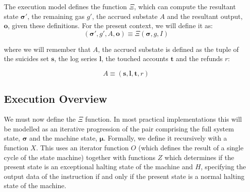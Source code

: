 \documentclass[9pt,oneside]{amsart}
\begin{document}
\begin{multicols}{2}
The execution model defines the function $\Xi$, which can compute the resultant state $\boldsymbol{\sigma}'$, the remaining gas $g'$, the accrued substate $A$ and the resultant output, $\mathbf{o}$, given these definitions. For the present context, we will define it as:
\begin{equation}
(\boldsymbol{\sigma}', g', A, \mathbf{o}) \equiv \Xi(\boldsymbol{\sigma}, g, I)
\end{equation}

where we will remember that $A$, the accrued substate is defined as the tuple of the suicides set $\mathbf{s}$, the log series $\mathbf{l}$, the touched accounts $\mathbf{t}$ and the refunds $r$:

\begin{equation}
A \equiv (\mathbf{s}, \mathbf{l}, \mathbf{t}, r)
\end{equation}

\subsection{Execution Overview}

We must now define the $\Xi$ function. In most practical implementations this will be modelled as an iterative progression of the pair comprising the full system state, $\boldsymbol{\sigma}$ and the machine state, $\boldsymbol{\mu}$. Formally, we define it recursively with a function $X$. This uses an iterator function $O$ (which defines the result of a single cycle of the state machine) together with functions $Z$ which determines if the present state is an exceptional halting state of the machine and $H$, specifying the output data of the instruction if and only if the present state is a normal halting state of the machine.


\end{multicols}
\end{document}
